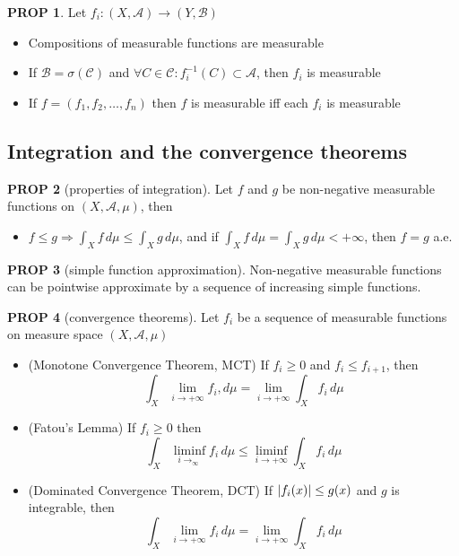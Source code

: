 \documentclass[hidelinks,11pt]{article}
\theoremstyle{definition}
\theoremstyle{dotles}
\theoremstyle{dotless}
\newtheorem{prop}{PROP}[section]
\theoremstyle{remark}
\begin{document}
\begin{prop}
Let $f_i:(X,\mathcal{A})\to(Y,\mathcal{B})$
\begin{itemize}
    \item Compositions of measurable functions are measurable
    \item If $\mathcal{B}=\sigma(\mathcal{C})$ and $\forall C\in\mathcal{C}:f_i^{-1}(C)\subset\mathcal{A}$, then $f_i$ is measurable
    \item If $f=(f_1,f_2,\dots,f_n)$ then $f$ is measurable iff each $f_i$ is measurable
\end{itemize}
\end{prop}

\subsection{Integration and the convergence theorems}

\begin{prop}[properties of integration]
Let $f$ and $g$ be non-negative measurable functions on $(X,\mathcal{A},\mu)$, then
\begin{itemize}
    \item $f\leq g\Rightarrow\int_Xf\,d\mu\leq\int_Xg\,d\mu$, and if $\int_Xf\,d\mu=\int_Xg\,d\mu<+\infty$, then $f=g$ a.e.
\end{itemize}
\end{prop}

\begin{prop}[simple function approximation]
Non-negative measurable functions can be pointwise approximate by a sequence of increasing simple functions.
\end{prop}

\begin{prop}[convergence theorems]
Let $f_i$ be a sequence of measurable functions on measure space $(X,\mathcal{A},\mu)$
\begin{itemize}
    \item \textup{(Monotone Convergence Theorem, MCT)} If $f_i\geq0$ and $f_i\leq f_{i+1}$, then \[\int_X\lim_{i\to+\infty}f_i,d\mu=\lim_{i\to+\infty}\int_Xf_i\,d\mu\]
    \item \textup{(Fatou's Lemma)} If $f_i\geq0$ then
    \[\int_X\liminf_{i\to_\infty}{f_i}\,d\mu\leq\liminf_{i\to+\infty}\int_Xf_i\,d\mu\]
    \item \textup{(Dominated Convergence Theorem, DCT)} If $\abs{f_i(x)}\leq g(x)$ and $g$ is integrable, then
    \[\int_X\lim_{i\to+\infty}f_i\,d\mu=\lim_{i\to+\infty}\int_Xf_i\,d\mu\]
\end{itemize}
\end{prop}
\end{document}
